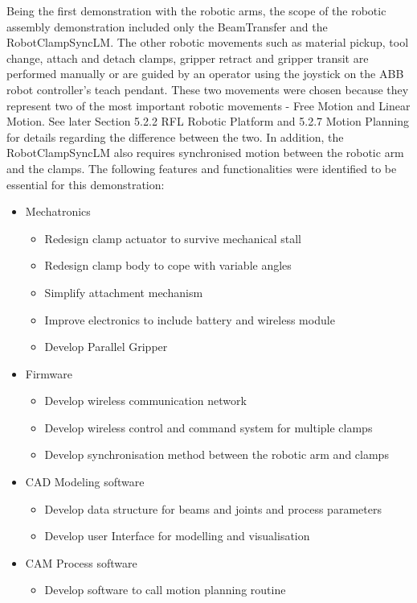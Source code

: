 Being the first demonstration with the robotic arms, the scope of the robotic assembly demonstration included only the BeamTransfer and the RobotClampSyncLM. The other robotic movements such as material pickup, tool change, attach and detach clamps, gripper retract and gripper transit are performed manually or are guided by an operator using the joystick on the ABB robot controller’s teach pendant.
These two movements were chosen because they represent two of the most important robotic movements - Free Motion and Linear Motion. See later Section 5.2.2 RFL Robotic Platform and 5.2.7 Motion Planning for details regarding the difference between the two. In addition, the RobotClampSyncLM also requires synchronised motion between the robotic arm and the clamps.
The following features and functionalities were identified to be essential for this demonstration:
\begin{itemize}
    \item Mechatronics
    \begin{itemize}
        \item Redesign clamp actuator to survive mechanical stall
        \item Redesign clamp body to cope with variable angles
        \item Simplify attachment mechanism
        \item Improve electronics to include battery and wireless module
        \item Develop Parallel Gripper
    \end{itemize}
    \item Firmware
    \begin{itemize}
        \item Develop wireless communication network
        \item Develop wireless control and command system for multiple clamps
        \item Develop synchronisation method between the robotic arm and clamps
    \end{itemize}
    \item CAD Modeling software 
    \begin{itemize}
        \item Develop data structure for beams and joints and process parameters
        \item Develop user Interface for modelling and visualisation
    \end{itemize}
    \item CAM Process software
    \begin{itemize}
        \item Develop software to call motion planning routine
    \end{itemize}
\end{itemize}

